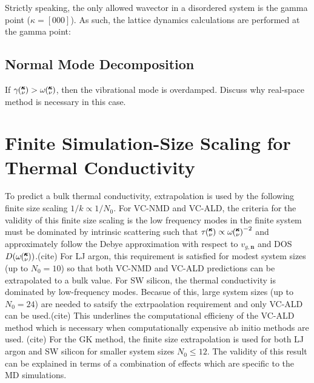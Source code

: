 \documentclass[aps,prb,twocolumn,superscriptaddress,preprintnumbers,amsmath,amssymb,floatfix]{revtex4}
\newcommand{\kv}{\mspace{-4.0mu}\left(\mspace{-8.0mu}
\begin{smallmatrix}&\pmb{\kappa} \\&\nu\end{smallmatrix}
\mspace{-3.0mu}\right)}
\begin{document}
Strictly speaking, the only allowed wavector in a disordered system is the 
gamma point ($\kappa = [0 0 0]$). As such, the lattice dynamics calculations 
are performed at the gamma point:

\subsection{\label{S:Lifetimes:}Normal Mode Decomposition}
If $\gamma \kv > \omega \kv$, then the vibrational mode is overdamped.  
Discuss why real-space method is necessary in this case.
\section{\label{A-Finite-Sim}Finite Simulation-Size Scaling for Thermal 
Conductivity}
To predict a bulk thermal conductivity, extrapolation is used by the 
following finite size scaling $ 1 / k \propto 1/N_0$. For VC-NMD and 
VC-ALD, the criteria for the validity of this finite size scaling 
is the low frequency modes in the finite system must be dominated by 
intrinsic scattering such that $\tau\kv \propto \omega\kv^{-2}$ 
and approximately follow the Debye approximation 
with respect to $v_{g,\mathbf{n}}$ and DOS $D(\omega\kv)$.(cite) For LJ 
argon, this requirement is satisfied for modest system sizes 
(up to $N_0 = 10$) so that both VC-NMD and VC-ALD predictions can be 
extrapolated to a bulk value. 
For SW silicon, the thermal conductivity is dominated by low-frequency 
modes. Becasue of this, large system sizes (up to $N_0 = 24$) are needed 
to satsify the 
extrpaolation requirement and only VC-ALD can be used.(cite) This 
underlines the computational efficieny of the VC-ALD method which is 
necessary when computationally expensive ab initio methods are used.
(cite) For the GK method, the finite size extrapolation is used for 
both LJ argon and SW silicon for smaller system sizes $N_0 \le 12$. 
The validity of this result can be explained in terms of a 
combination of effects which are specific to the MD simulations.
\cite{esfarjani_heat_2011}


\clearpage


\end{document}
